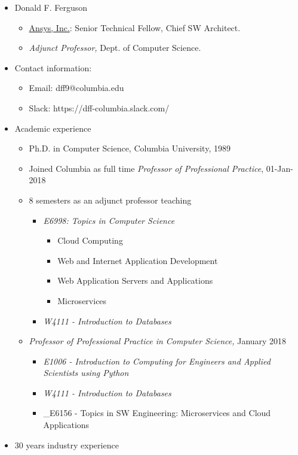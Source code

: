 \documentclass[11pt]{article}
\providecommand{\tightlist}{%
      \setlength{\itemsep}{0pt}\setlength{\parskip}{0pt}}
\begin{document}
\begin{itemize}
\tightlist
\item
  Donald F. Ferguson

  \begin{itemize}
  \tightlist
  \item
    \href{https://www.ansys.com/}{Ansys, Inc.}: Senior Technical Fellow,
    Chief SW Architect.
  \item
    \emph{Adjunct Professor,} Dept. of Computer Science.
  \end{itemize}
\item
  Contact information:

  \begin{itemize}
  \tightlist
  \item
    Email: dff9@columbia.edu
  \item
    Slack: https://dff-columbia.slack.com/
  \end{itemize}
\item
  Academic experience

  \begin{itemize}
  \tightlist
  \item
    Ph.D. in Computer Science, Columbia University, 1989
  \item
    Joined Columbia as full time \emph{Professor of Professional
    Practice}, 01-Jan-2018
  \item
    8 semesters as an adjunct professor teaching

    \begin{itemize}
    \tightlist
    \item
      \emph{E6998: Topics in Computer Science}

      \begin{itemize}
      \tightlist
      \item
        Cloud Computing
      \item
        Web and Internet Application Development
      \item
        Web Application Servers and Applications
      \item
        Microservices
      \end{itemize}
    \item
      \emph{W4111 - Introduction to Databases}
    \end{itemize}
  \item
    \emph{Professor of Professional Practice in Computer Science,}
    January 2018

    \begin{itemize}
    \tightlist
    \item
      \emph{E1006 - Introduction to Computing for Engineers and Applied
      Scientists using Python}
    \item
      \emph{W4111 - Introduction to Databases}
    \item
      \_E6156 - Topics in SW Engineering: Microservices and Cloud
      Applications
    \end{itemize}
  \end{itemize}
\item
  30 years industry experience


\end{itemize}
\end{document}
